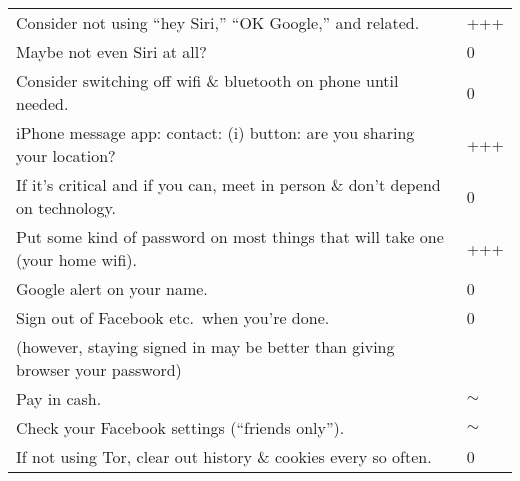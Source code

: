 \documentclass{tufte-handout}
\begin{document}
\begin{tabular}{p{5in}l}
Consider not using ``hey Siri,'' ``OK Google,'' and related. & +++ \\

Maybe not even Siri at all? & 0 \\

Consider switching off wifi \& bluetooth on phone until needed. & 0 \\

iPhone message app: contact: (i) button: are you sharing your location? & +++ \\

If it's critical and if you can, meet in person \& don't depend on technology. & 0 \\

Put some kind of password on most things that will take one (your home wifi). & +++ \\

Google alert on your name. & 0 \\

Sign out of Facebook etc.\ when you're done. & 0 \\

\qquad \small(however, staying signed in may be better than giving browser your password) \\

Pay in cash. & $\sim$ \\

Check your Facebook settings (``friends only''). & $\sim$ \\

If not using Tor, clear out history \& cookies every so often. & 0 \\



\end{tabular}
\end{document}
